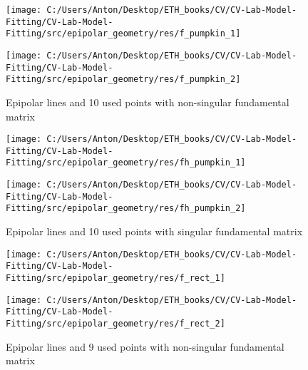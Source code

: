 \documentclass{report}
\begin{document}
	\begin{figure}[h]
	\begin{center}
		\begin{minipage}[h]{0.49\linewidth}
			\texttt{[image: C:/Users/Anton/Desktop/ETH\_books/CV/CV-Lab-Model-Fitting/CV-Lab-Model-Fitting/src/epipolar\_geometry/res/f\_pumpkin\_1]}
		\end{minipage}
		\hfill
		\begin{minipage}[h]{0.49\linewidth}
			\texttt{[image: C:/Users/Anton/Desktop/ETH\_books/CV/CV-Lab-Model-Fitting/CV-Lab-Model-Fitting/src/epipolar\_geometry/res/f\_pumpkin\_2]}
		\end{minipage}
		\caption{Epipolar lines and 10 used points with non-singular fundamental matrix}
	\end{center}
\end{figure}

	\begin{figure}[h]
	\begin{center}
		\begin{minipage}[h]{0.49\linewidth}
			\texttt{[image: C:/Users/Anton/Desktop/ETH\_books/CV/CV-Lab-Model-Fitting/CV-Lab-Model-Fitting/src/epipolar\_geometry/res/fh\_pumpkin\_1]}
		\end{minipage}
		\hfill
		\begin{minipage}[h]{0.49\linewidth}
			\texttt{[image: C:/Users/Anton/Desktop/ETH\_books/CV/CV-Lab-Model-Fitting/CV-Lab-Model-Fitting/src/epipolar\_geometry/res/fh\_pumpkin\_2]}
		\end{minipage}
		\caption{Epipolar lines and 10 used points with singular fundamental matrix}
	\end{center}
\end{figure}
\begin{figure}[h!]
	\begin{center}
		\begin{minipage}[h!]{0.49\linewidth}
			\texttt{[image: C:/Users/Anton/Desktop/ETH\_books/CV/CV-Lab-Model-Fitting/CV-Lab-Model-Fitting/src/epipolar\_geometry/res/f\_rect\_1]}
		\end{minipage}
		\hfill
		\begin{minipage}[h!]{0.49\linewidth}
			\texttt{[image: C:/Users/Anton/Desktop/ETH\_books/CV/CV-Lab-Model-Fitting/CV-Lab-Model-Fitting/src/epipolar\_geometry/res/f\_rect\_2]}
		\end{minipage}
		
		\caption{Epipolar lines and 9 used points with non-singular fundamental matrix}
	\end{center}
\end{figure}
\end{document}
